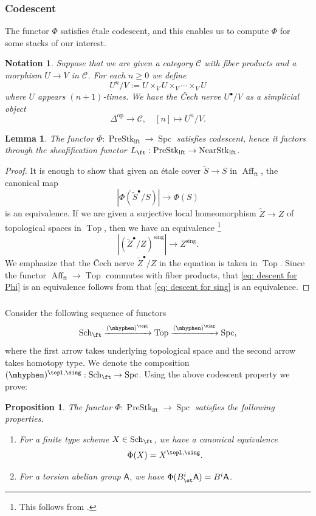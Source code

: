 \documentclass[10pt]{amsart}
\newcommand{\sssec}{\subsubsection}
\newtheorem{lemma}[subsubsection]{Lemma}
\newtheorem{prop}[subsubsection]{Proposition}
\newtheorem{nota}[subsubsection]{Notation}
\theoremstyle{remark}
\newcommand{\wt}{\widetilde}
\newcommand{\on}{\operatorname}
\newcommand{\cC}{\mathcal{C}}
\newcommand{\PreStklft}{\on{PreStk}_{\on{lft}}}
\newcommand{\NearStklft}{\on{NearStk}_{\on{lft}}}
\newcommand{\Affft}{\on{Aff}_{\on{ft}}}
\newcommand{\Spc}{\on{Spc}}
\DeclareMathOperator{\op}{op}
\newcommand{\sfA}{\mathsf{A}}
\begin{document}
\sssec{Codescent} The functor $\Phi$ satisfies \'etale codescent, and this enables us to compute $\Phi$ for some stacks of our interest.
\begin{nota}
    Suppose that we are given a category $\cC$ with fiber products and a morphism $U\rightarrow V$ in $\cC$. For each $n\ge 0$ we define
    \[U^n/V:=U\times_V U\times_V\cdots\times_V U\]
    where $U$ appears $(n+1)$-times. We have the \emph{\v{C}ech nerve} $U^{\bullet}/V$ as a simplicial object
    \[\Delta^{\op}\rightarrow \cC,\quad [n]\mapsto U^n/V.\]
\end{nota}
\begin{lemma}
    The functor $\Phi: \PreStklft \rightarrow \Spc$ satisfies codescent, hence it factors through the sheafification functor $L_{\ft}:\PreStklft \rightarrow \NearStklft$. 
\end{lemma}
\begin{proof}
It is enough to show that given an \'etale cover $\wt{S}\rightarrow S$ in $\Affft$, the canonical map
\begin{equation}\label{eq: descent for Phi}
    |\Phi(\wt{S}^{\bullet}/S)|\rightarrow\Phi(S)
\end{equation}
is an equivalence.
If we are given a surjective local homeomorphism $\wt{Z}\rightarrow Z$ of topological spaces in $\on{Top}$, then we have an equivalence \footnote{This follows from \cite[Theorem 1.1]{DI04}.}
\begin{equation}\label{eq: descent for sing}
    |(\wt{Z}^{\bullet}/Z)^{\on{sing}}|\rightarrow Z^{\on{sing}}.
\end{equation}
We emphasize that the \v{C}ech nerve $\wt{Z}^{\bullet}/Z$ in the equation is taken in $\on{Top}$.
Since the functor $\Affft\rightarrow \on{Top}$ commutes with fiber products, that \eqref{eq: descent for Phi} is an equivalence follows from that \eqref{eq: descent for sing} is an equivalence.
\end{proof}



\sssec{}
Consider the following sequence of functors
\[\on{Sch}_{\ft}\xrightarrow{(\mhyphen)^{\topl}}\on{Top}\xrightarrow{(\mhyphen)^{\sing}}\Spc,\]
where the first arrow takes underlying topological space and the second arrow takes homotopy type. We denote the composition $(\mhyphen)^{\topl,\sing}:\on{Sch}_{\ft}\rightarrow \Spc$. Using the above codescent property we prove:

\begin{prop}\label{prop: homotopy type}
    The functor $\Phi: \PreStklft \rightarrow \Spc$ satisfies the following properties.
    \begin{enumerate}
        \item For a finite type scheme $X\in\on{Sch}_{\ft}$, we have a canonical equivalence
        \[\Phi(X)=X^{\topl,\sing}.\]
        \item For a torsion abelian group $\sfA$, we have $\Phi(B^i_{\et}\sfA)=B^i\sfA$.
    \end{enumerate}
\end{prop}
\end{document}
